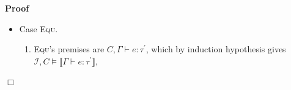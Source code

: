 \documentclass{article}
\newcommand{\tmname}[1]{\textsc{#1}}
\newcommand{\tmop}[1]{\ensuremath{\operatorname{#1}}}
\newenvironment{proof}{\noindent\textbf{Proof\ }}{\hspace*{\fill}$\Box$\medskip}
\begin{document}
\begin{proof}
\begin{itemize}
\begin{enumerate}
      \item By induction hypothesis applied to (13) we have $\mathcal{I}_i^1,
      C \wedge D^{\prime} \wedge \alpha^1_i \dot{=} \tau_{m_i}^{\prime} \vDash
      \llbracket \Gamma \Gamma^{\prime\prime} \vdash m_i : \tmop{Num}
      (\alpha^1_i) \rrbracket$ and $\mathcal{I}_i^2, C \wedge D^{\prime}
      \wedge \alpha^2_i \dot{=} \tau_{n_i}^{\prime} \vDash \llbracket \Gamma
      \Gamma^{\prime\prime} \vdash n_i : \tmop{Num} (\alpha^2_i) \rrbracket$.
      
      \item By lemma \ref{MonoEnvEq} and weakening, (2) implies $C \wedge D
      \wedge \Gamma^{\prime\prime} \dot{=} \Gamma^{\prime} \wedge \alpha_3
      \dot{=} \tau_3 \wedge_i \alpha^1_i \dot{=} \tau_{m_i} \wedge_i
      \alpha^2_i \dot{=} \tau_{n_i} \wedge \tau_1 \dot{=} \alpha_3 \wedge_i
      \alpha_i^1 \leq \alpha_i^2, \Gamma \Gamma^{\prime\prime} \vdash s :
      \tmop{String}$.
      
      \item By (15), {\tmname{Hide}} and (12), we get $C \wedge D^{\prime}
      \wedge \alpha_3 \dot{=} \tau_3 \wedge_i \alpha^1_i \dot{=}
      \tau_{m_i}^{\prime} \wedge_i \alpha^2_i \dot{=} \tau_{n_i}^{\prime}
      \wedge \tau_1 \dot{=} \alpha_3 \wedge_i \alpha_i^1 \leq \alpha_i^2,
      \Gamma \Gamma^{\prime\prime} \vdash s : \tmop{String}$.
      
      \item By induction hypothesis, (16) gives $\mathcal{I}^3, C \wedge
      D^{\prime} \wedge \alpha_3 \dot{=} \tau_3 \wedge_i \alpha^1_i \dot{=}
      \tau_{m_i}^{\prime} \wedge_i \alpha^2_i \dot{=} \tau_{n_i}^{\prime}
      \wedge \tau_1 \dot{=} \alpha_3 \wedge_i \alpha_i^1 \leq \alpha_i^2
      \vDash \llbracket \Gamma \Gamma^{\prime\prime} \vdash s : \tmop{String}
      \rrbracket$.
      
      \item By (8), (10), (14) and (17), we get $\overline{\mathcal{I}_i^1}
      \overline{\mathcal{I}_i^2} \mathcal{I}^3, C \wedge \alpha_3 \dot{=}
      \tau_3 \wedge_i \alpha^1_i \dot{=} \tau_{m_i}^{\prime} \wedge_i
      \alpha^2_i \dot{=} \tau_{n_i}^{\prime} \vDash \Phi$.
      
      \item By nonemptiness of the domains, from (18) we get the goal
      $\overline{\mathcal{I}_i^1} \overline{\mathcal{I}_i^2} \mathcal{I}^3, C
      \vDash \exists \alpha_3 \overline{\alpha^1_i \alpha^2_i} . \Phi$.
    \end{enumerate}
    \item Case {\tmname{Equ}}.
    \begin{enumerate}
      \item {\tmname{Equ}}'s premises are $C, \Gamma \vdash e :
      \tau^{\prime}$, which by induction hypothesis gives $\mathcal{I}, C
      \vDash \llbracket \Gamma \vdash e : \tau^{\prime} \rrbracket$,
      

\end{enumerate}
\end{itemize}
\end{proof}
\end{document}
